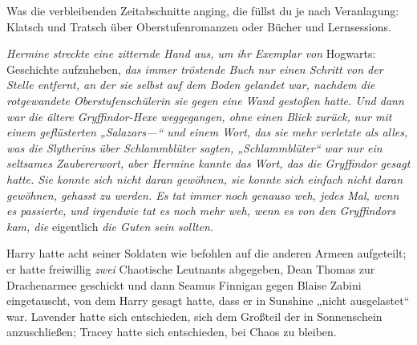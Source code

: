 Was die verbleibenden Zeitabschnitte anging, die füllst du je nach Veranlagung: Klatsch und Tratsch über Oberstufenromanzen oder Bücher und Lernsessions.

\emph{Hermine streckte eine zitternde Hand aus, um ihr Exemplar von} Hogwarts: Geschichte aufzuheben, \emph{das immer tröstende Buch nur einen Schritt von der Stelle entfernt, an der sie selbst auf dem Boden gelandet war, nachdem die rotgewandete Oberstufenschülerin sie gegen eine Wand gestoßen hatte. Und dann war die ältere Gryffindor-Hexe weggegangen, ohne einen Blick zurück, nur mit einem geflüsterten „Salazars—“ und einem Wort, das sie mehr verletzte als alles, was die Slytherins über Schlammblüter sagten, „Schlammblüter“ war nur} \emph{ein seltsames Zaubererwort, aber Hermine kannte das Wort, das die Gryffindor gesagt hatte. Sie konnte sich nicht daran gewöhnen, sie konnte sich einfach nicht daran gewöhnen, gehasst zu werden. Es tat immer noch genauso weh, jedes Mal, wenn es passierte, und irgendwie tat es noch mehr weh, wenn es von den Gryffindors kam, die} eigentlich \emph{die Guten sein sollten.}

Harry hatte acht seiner Soldaten wie befohlen auf die anderen Armeen aufgeteilt; er hatte freiwillig \emph{zwei} Chaotische Leutnants abgegeben, Dean Thomas zur Drachenarmee geschickt und dann Seamus Finnigan gegen Blaise Zabini eingetauscht, von dem Harry gesagt hatte, dass er in Sunshine „nicht ausgelastet“ war. Lavender hatte sich entschieden, sich dem Großteil der \SPHEW in Sonnenschein anzuschließen; Tracey hatte sich entschieden, bei Chaos zu bleiben.

